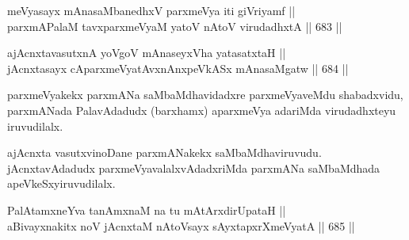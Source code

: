 
\begin{shl}
meVyasayx mAnasaMbanedhxV parxmeVya iti giVriyamf || \\
parxmAPalaM tavxparxmeVyaM yatoV nAtoV virudadhxtA \hfill || 683 ||  
\end{shl}
				
\begin{shl}
ajAcnxtavasutxnA yoVgoV mAnaseyxVha yatasatxtaH || \\
jAcnxtasayx cAparxmeVyatAvxnAnxpeVkASx mAnasaMgatw \hfill || 684 ||  
\end{shl}

\begin{artha} 
parxmeVyakekx parxmANa saMbaMdhavidadxre parxmeVyaveMdu shabadxvidu, parxmANada PalavAdadudx (barxhamx) aparxmeVya adariMda virudadhxteyu iruvudilalx.

ajAcnxta vasutxvinoDane parxmANakekx saMbaMdhaviruvudu. jAcnxtavAdadudx parxmeVyavalalxvAdadxriMda parxmANa saMbaMdhada apeVkeSxyiruvudilalx.
\end{artha}


\begin{shl}
PalAtamxneYva tanAmxnaM na tu mAtArxdirUpataH || \\
aBivayxnakitx noV jAcnxtaM nAtoV\s sayx sAyxtapxrXmeVyatA \hfill || 685 ||  
\end{shl}

